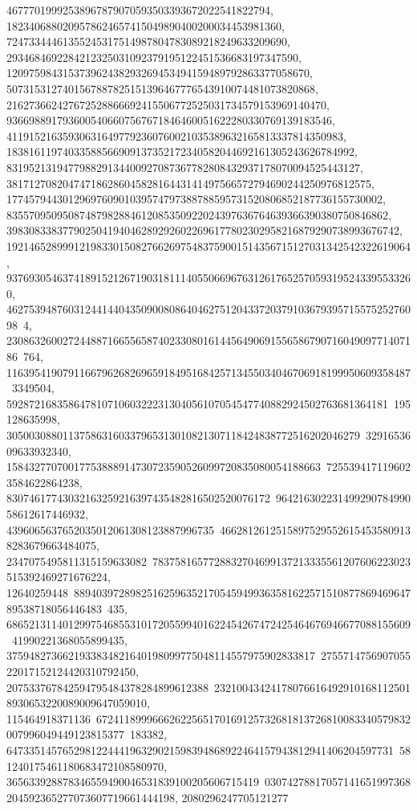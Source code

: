 {{{   46777019992538967879070593503393672022541822794, 
   1823406880209578624657415049890400200034453981360, 
   72473344461355245317514987804783089218249633209690, 
   2934684692284212325031092379195122451536683197347590, 
   120975984315373962438293269453494159489792863377058670, 
   5073153127401567887825151396467776543910074481073820868, 
   216273662427672528866692415506772525031734579153969140470, 
   9366988917936005406607567671846460051622280330769139183546, 
   411915216359306316497792360760021035389632165813337814350983, 
   18381611974033588566909137352172340582044692161305243626784992, 
   831952131947798829134400927087367782808432937178070094525443127, 
   38171270820474718628604582816443141497566572794690244250976812575, 
   1774579443012969760901039574797388788595731520806852187736155730002, 
   83557095095087487982884612085350922024397636764639366390380750846862, 
   3983083383779025041940462892926022696177802302958216879290738993676742, 
   192146528999121983301508276626975483759001514356715127031342542322619064, 
   9376930546374189152126719031811140550669676312617652570593195243395533260, 
   46275394876031244144043509008086404627512043372037910367939571557525276098\
4, 
   23086326002724488716655658740233080161445649069155658679071604909771407186\
764, 116395419079116679626826965918495168425713455034046706918199950609358487\
3349504, 59287216835864781071060322231304056107054547740882924502763681364181\
195128635998, 305003088011375863160337965313010821307118424838772516202046279\
3291653609633932340, 15843277070017753888914730723590526099720835080054188663\
7255394171196023584622864238, 83074617743032163259216397435482816502520076172\
96421630223149929078499058612617446932, 4396065637652035012061308123887996735\
46628126125158975295526154535809138283679663484075, 2347075495811315159633082\
7837581657728832704699137213335561207606223023515392469271676224, 12640259448\
88940397289825162596352170545949936358162257151087786946964789538718056446483\
435, 686521311401299754685531017205599401622454267472425464676946677088155609\
41990221368055899435, 3759482736621933834821640198099775048114557975902833817\
275571475690705522017152124420310792450, 207533767842594795484378284899612388\
232100434241780766164929101681125018930653220089009647059010, 115464918371136\
67241189996662622565170169125732681813726810083340579832007996049449123815377\
183382, 647335145765298122444196329021598394868922464157943812941406204597731\
581240175461180683472108580970, 365633928878346559490046531839100205606715419\
03074278817057141651997368204592365277073607719661444198, 2080296247705121277\
}}}
